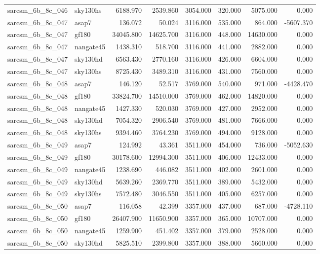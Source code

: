 \begin{tabular}{llrrrrrr}
sarcsm\_6b\_8c\_046 & sky130hs & 6188.970 & 2539.860 & 3054.000 & 320.000 & 5075.000 & 0.000 \\
sarcsm\_6b\_8c\_047 & asap7 & 136.072 & 50.024 & 3116.000 & 535.000 & 864.000 & -5607.370 \\
sarcsm\_6b\_8c\_047 & gf180 & 34045.800 & 14625.700 & 3116.000 & 448.000 & 14630.000 & 0.000 \\
sarcsm\_6b\_8c\_047 & nangate45 & 1438.310 & 518.700 & 3116.000 & 441.000 & 2882.000 & 0.000 \\
sarcsm\_6b\_8c\_047 & sky130hd & 6563.430 & 2770.160 & 3116.000 & 426.000 & 6604.000 & 0.000 \\
sarcsm\_6b\_8c\_047 & sky130hs & 8725.430 & 3489.310 & 3116.000 & 431.000 & 7560.000 & 0.000 \\
sarcsm\_6b\_8c\_048 & asap7 & 146.120 & 52.517 & 3769.000 & 540.000 & 971.000 & -4428.470 \\
sarcsm\_6b\_8c\_048 & gf180 & 33824.700 & 14510.000 & 3769.000 & 462.000 & 14820.000 & 0.000 \\
sarcsm\_6b\_8c\_048 & nangate45 & 1427.330 & 520.030 & 3769.000 & 427.000 & 2952.000 & 0.000 \\
sarcsm\_6b\_8c\_048 & sky130hd & 7054.320 & 2906.540 & 3769.000 & 481.000 & 7666.000 & 0.000 \\
sarcsm\_6b\_8c\_048 & sky130hs & 9394.460 & 3764.230 & 3769.000 & 494.000 & 9128.000 & 0.000 \\
sarcsm\_6b\_8c\_049 & asap7 & 124.992 & 43.361 & 3511.000 & 454.000 & 736.000 & -5052.630 \\
sarcsm\_6b\_8c\_049 & gf180 & 30178.600 & 12994.300 & 3511.000 & 406.000 & 12433.000 & 0.000 \\
sarcsm\_6b\_8c\_049 & nangate45 & 1238.690 & 446.082 & 3511.000 & 402.000 & 2601.000 & 0.000 \\
sarcsm\_6b\_8c\_049 & sky130hd & 5639.260 & 2369.770 & 3511.000 & 389.000 & 5432.000 & 0.000 \\
sarcsm\_6b\_8c\_049 & sky130hs & 7572.480 & 3046.550 & 3511.000 & 405.000 & 6257.000 & 0.000 \\
sarcsm\_6b\_8c\_050 & asap7 & 116.058 & 42.399 & 3357.000 & 437.000 & 687.000 & -4728.110 \\
sarcsm\_6b\_8c\_050 & gf180 & 26407.900 & 11650.900 & 3357.000 & 365.000 & 10707.000 & 0.000 \\
sarcsm\_6b\_8c\_050 & nangate45 & 1259.900 & 451.402 & 3357.000 & 379.000 & 2528.000 & 0.000 \\
sarcsm\_6b\_8c\_050 & sky130hd & 5825.510 & 2399.800 & 3357.000 & 388.000 & 5660.000 & 0.000 \\

\end{tabular}
